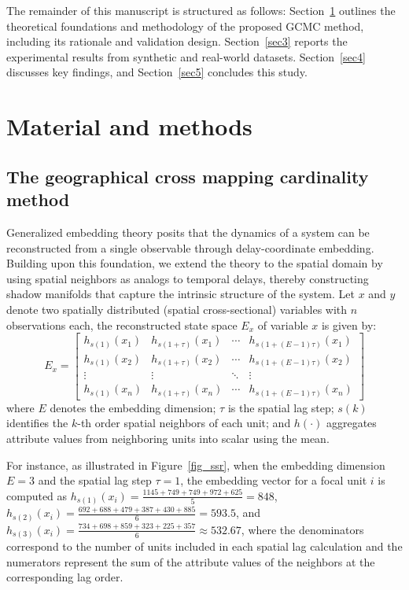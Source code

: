 \documentclass[authoryear,preprint,review,12pt]{elsarticle}
\begin{document}
The remainder of this manuscript is structured as follows: Section~\ref{sec2} outlines the theoretical foundations and methodology of the proposed GCMC method, including its rationale and validation design. Section~\ref{sec3} reports the experimental results from synthetic and real-world datasets. Section~\ref{sec4} discusses key findings, and Section~\ref{sec5} concludes this study.

\section{Material and methods}\label{sec2} 

\subsection{The geographical cross mapping cardinality method}

Generalized embedding theory \citep{Takens1981embedding,Mane1981embedding} posits that the dynamics of a system can be reconstructed from a single observable through delay-coordinate embedding. Building upon this foundation, we extend the theory to the spatial domain by using spatial neighbors as analogs to temporal delays, thereby constructing shadow manifolds that capture the intrinsic structure of the system. Let $x$ and $y$ denote two spatially distributed (spatial cross-sectional) variables with $n$ observations each, the reconstructed state space $E_x$ of variable $x$ is given by:
\begin{equation}\label{eq-embedding}
E_x = \begin{bmatrix}
h_{s(1)}(x_1) & h_{s(1+\tau)}(x_1) & \cdots & h_{s(1+(E-1)\tau)}(x_1) \\
h_{s(1)}(x_2) & h_{s(1+\tau)}(x_2) & \cdots & h_{s(1+(E-1)\tau)}(x_2) \\
\vdots & \vdots & \ddots & \vdots \\
h_{s(1)}(x_n) & h_{s(1+\tau)}(x_n) & \cdots & h_{s(1+(E-1)\tau)}(x_n)
\end{bmatrix}
\end{equation}
\noindent where $E$ denotes the embedding dimension; $\tau$ is the spatial lag step; $s(k)$ identifies the $k$-th order spatial neighbors of each unit; and $h(\cdot)$ aggregates attribute values from neighboring units into scalar using the mean. 

For instance, as illustrated in Figure~\ref{fig_ssr}, when the embedding dimension \(E = 3\) and the spatial lag step \(\tau = 1\), the embedding vector for a focal unit \(i\) is computed as 
\(h_{s(1)}(x_i) = \frac{1145 + 749 + 749 + 972 + 625}{5} = 848\),  
\(h_{s(2)}(x_i) = \frac{692 + 688 + 479 + 387 + 430 + 885}{6} = 593.5\), and  
\(h_{s(3)}(x_i) = \frac{734 + 698 + 859 + 323 + 225 + 357}{6} \approx 532.67\),  
where the denominators correspond to the number of units included in each spatial lag calculation and the numerators represent the sum of the attribute values of the neighbors at the corresponding lag order.
\end{document}
